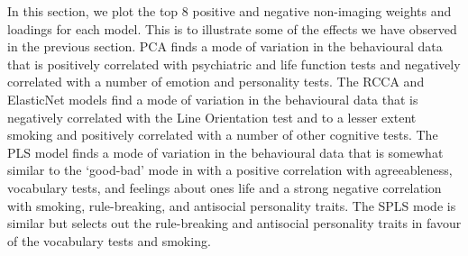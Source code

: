 In this section, we plot the top 8 positive and negative non-imaging weights and loadings for each model.
This is to illustrate some of the effects we have observed in the previous section.
PCA finds a mode of variation in the behavioural data that is positively correlated with psychiatric and life function tests and negatively correlated with a number of emotion and personality tests.
The RCCA and ElasticNet models find a mode of variation in the behavioural data that is negatively correlated with the Line Orientation test and to a lesser extent smoking and positively correlated with a number of other cognitive tests.
The PLS model finds a mode of variation in the behavioural data that is somewhat similar to the `good-bad' mode in \cite{smith2015positive} with a positive correlation with agreeableness, vocabulary tests, and feelings about ones life and a strong negative correlation with smoking, rule-breaking, and antisocial personality traits.
The SPLS mode is similar but selects out the rule-breaking and antisocial personality traits in favour of the vocabulary tests and smoking.

